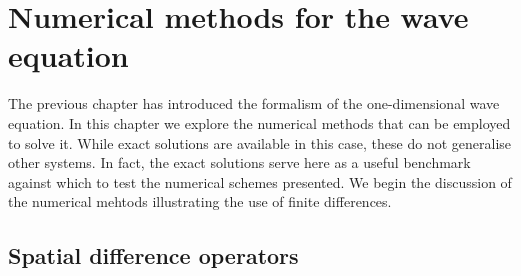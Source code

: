 \newcommand{\dif}{\mathop{}\!\mathrm{d}}
\newcommand{\al}{\alpha}
\newcommand{\bt}{\beta}
\newcommand{\om}{\omega}
\newcommand{\gm}{\gamma}
\newcommand{\lb}{\lambda}
\newcommand{\lm}{\lambda_-}
\newcommand{\lp}{\lambda_+}
\newcommand{\thw}{\theta_w}
\newcommand{\thp}{\theta_\phi}
\newcommand{\tht}{\theta}

\newcommand{\etp}{e_{t+}}
\newcommand{\etm}{e_{t-}}

\newcommand{\esp}{e_{x+}}
\newcommand{\esm}{e_{x-}}

\newcommand{\dsp}{\delta_{x+}}
\newcommand{\dsm}{\delta_{x-}}
\newcommand{\dsd}{\delta_{x\cdot}}
\newcommand{\dss}{\delta_{xx}}
\newcommand{\dssss}{\delta_{xxxx}}

\newcommand{\dtp}{\delta_{t+}}
\newcommand{\dtm}{\delta_{t-}}
\newcommand{\dtd}{\delta_{t\cdot}}
\newcommand{\dtt}{\delta_{tt}}
\newcommand{\dtttt}{\delta_{tttt}}
\newcommand{\dspm}{\delta_{x\pm}}

\newcommand{\mtp}{\mu_{t+}}
\newcommand{\mtm}{\mu_{t-}}
\newcommand{\mtd}{\mu_{t\cdot}}
\newcommand{\mtt}{\mu_{tt}}

\newcommand{\norm}[1]{\left\|#1\right\|}
\newcommand{\innp}[1]{\left\langle#1\right\rangle}
\newcommand{\virg}[1]{``#1''}

\chapter{Numerical methods for the wave equation}


The previous chapter has introduced the formalism of the one-dimensional wave equation. In this chapter we explore the numerical methods that can be employed to solve it. While exact solutions are available in this case, these do not generalise other systems. In fact, the exact solutions serve here as a useful benchmark against which to test the numerical schemes presented. We begin the discussion of the numerical mehtods illustrating the use of finite differences. 


\section{Spatial difference operators}


